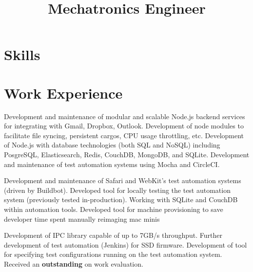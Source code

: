 \documentclass[11pt,a4paper]{moderncv}
\title{Mechatronics Engineer}               %
\begin{document}
\maketitle

\vspace{-13mm}

\section{Skills}


\section{Work Experience}
{ Development and maintenance of modular and scalable Node.js backend services for integrating with Gmail, Dropbox, Outlook.
    \newline{} Development of node modules to facilitate file syncing, persistent cargos, CPU usage throttling, etc.
    \newline{} Development of Node.js with database technologies (both SQL and NoSQL) including PosgreSQL, Elasticsearch, Redis, CouchDB, MongoDB, and SQLite.
    \newline{} Development and maintenance of test automation systems using Mocha and CircleCI.}

{Development and maintenance of Safari and WebKit's test automation systems (driven by Buildbot).
    \newline{}Developed tool for locally testing the test automation system (previously tested in-production).
    \newline{}Working with SQLite and CouchDB within automation tools.
\newline{}Developed tool for machine provisioning to save developer time spent manually reimaging mac minis}

{Development of IPC library capable of up to 7GB/s throughput.
    \newline{}Further development of test automation (Jenkins) for SSD firmware.
    \newline{}Development of tool for specifying test configurations running on the test automation system.
\newline{}Received an \textbf{outstanding} on work evaluation.}
\end{document}
